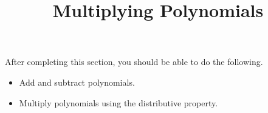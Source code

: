 \documentclass{ximera}
\title{Multiplying Polynomials}
\begin{document}
\begin{abstract} 
\end{abstract}

\maketitle

\begin{sectionOutcomes}
After completing this section, you should be able to do the following.

\begin{itemize}
	\item Add and subtract polynomials.
    \item Multiply polynomials using the distributive property.

\end{itemize}
\end{sectionOutcomes}
\end{document}
